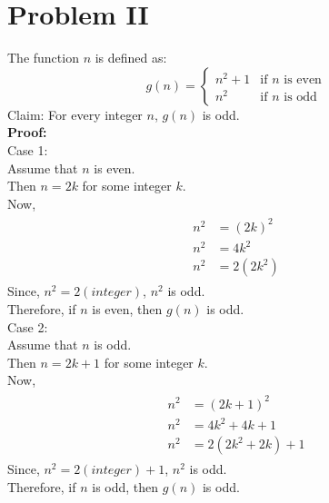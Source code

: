 \documentclass{book}
\begin{document}
\vspace{1em}

\section{Problem II}
The function $n$ is defined as:
\begin{equation*}
    g(n) = \begin{cases}
        n^2 + 1 &\text{if $n$ is even} \\
        n^2     &\text{if $n$ is odd}
    \end{cases}
\end{equation*}
Claim: For every integer $n$, $g(n)$ is odd. \\

\textbf{Proof:} \\
Case 1: \\
Assume that $n$ is even. \\
Then $n = 2k$ for some integer $k$. \\
Now, \begin{multline} \label{eq3}
    \begin{split}
        n^2 &= (2k)^2 \\
        n^2 &= 4k^2 \\
        n^2 &= 2(2k^2)
    \end{split}
\end{multline}
Since, $n^2 = 2(integer)$, $n^2$ is odd. \\
Therefore, if $n$ is even, then $g(n)$ is odd. \\

Case 2: \\
Assume that $n$ is odd. \\
Then $n = 2k + 1$ for some integer $k$. \\
Now, \begin{multline} \label{eq4}
    \begin{split}
        n^2 &= (2k + 1)^2 \\
        n^2 &= 4k^2 + 4k + 1 \\
        n^2 &= 2(2k^2 + 2k) + 1
    \end{split}
\end{multline}
Since, $n^2 = 2(integer) + 1$, $n^2$ is odd. \\
Therefore, if $n$ is odd, then $g(n)$ is odd. \\
\end{document}
